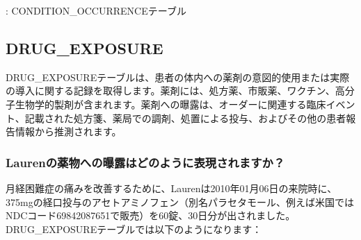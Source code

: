 \documentclass[
  11pt]{book}
\theoremstyle{definition}
\theoremstyle{definition}
\theoremstyle{definition}
\theoremstyle{definition}
\theoremstyle{remark}
\begin{document}
: \label{tab:conditionOccurrence} CONDITION\_OCCURRENCEテーブル

\subsection{DRUG\_EXPOSURE}\label{drugExposure}

DRUG\_EXPOSUREテーブルは、患者の体内への薬剤の意図的使用または実際の導入に関する記録を取得します。薬剤には、処方薬、市販薬、ワクチン、高分子生物学的製剤が含まれます。薬剤への曝露は、オーダーに関連する臨床イベント、記載された処方箋、薬局での調剤、処置による投与、およびその他の患者報告情報から推測されます。

\subsubsection*{Laurenの薬物への曝露はどのように表現されますか？}\label{laurenux306eux85acux7269ux3078ux306eux66ddux9732ux306fux3069ux306eux3088ux3046ux306bux8868ux73feux3055ux308cux307eux3059ux304b}

月経困難症の痛みを改善するために、Laurenは2010年01月06日の来院時に、375mgの経口投与のアセトアミノフェン（別名パラセタモール、例えば米国ではNDCコード69842087651で販売）を60錠、30日分が出されました。DRUG\_EXPOSUREテーブルでは以下のようになります：
\end{document}
